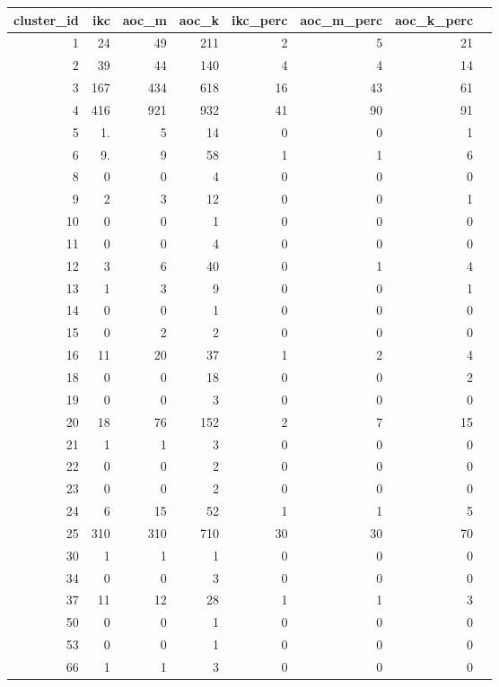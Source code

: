 \documentclass[12pt, oneside]{article}   	%
\begin{document}
\begin{table}[ht]
\centering
\begin{tabular}{rrrrrrrr}
  \hline
cluster\_id & ikc & aoc\_m & aoc\_k & ikc\_perc & aoc\_m\_perc & aoc\_k\_perc \\ 
  \hline
1 & 24 &  49 & 211 &   2 &   5 &  21 \\ 
2 & 39 &  44 & 140 &   4 &   4 &  14 \\ 
3 & 167 & 434 & 618 &  16 &  43 &  61 \\ 
4 & 416 & 921 & 932 &  41 &  90 &  91 \\ 
5 & 1. &   5 &  14 &   0 &   0 &   1 \\ 
6 & 9. &   9 &  58 &   1 &   1 &   6 \\ 
8 & 0 &   0 &   4 &   0 &   0 &   0 \\ 
9 & 2 &   3 &  12 &   0 &   0 &   1 \\ 
10 & 0 &   0 &   1 &   0 &   0 &   0 \\ 
11 & 0 &   0 &   4 &   0 &   0 &   0 \\ 
12 & 3 &   6 &  40 &   0 &   1 &   4 \\ 
13 & 1 &   3 &   9 &   0 &   0 &   1 \\ 
14 & 0 &   0 &   1 &   0 &   0 &   0 \\ 
15 & 0 &   2 &   2 &   0 &   0 &   0 \\ 
16 & 11 &  20 &  37 &   1 &   2 &   4 \\ 
18 & 0 &   0 &  18 &   0 &   0 &   2 \\ 
19 & 0 &   0 &   3 &   0 &   0 &   0 \\ 
20 & 18 &  76 & 152 &   2 &   7 &  15 \\ 
21 & 1 &   1 &   3 &   0 &   0 &   0 \\ 
22 & 0 &   0 &   2 &   0 &   0 &   0 \\ 
23 & 0 &   0 &   2 &   0 &   0 &   0 \\ 
24 & 6 &  15 &  52 &   1 &   1 &   5 \\ 
25 & 310 & 310 & 710 &  30 &  30 &  70 \\ 
30 & 1 &   1 &   1 &   0 &   0 &   0 \\ 
34 & 0 &   0 &   3 &   0 &   0 &   0 \\ 
37 & 11 &  12 &  28 &   1 &   1 &   3 \\ 
50 & 0 &   0 &   1 &   0 &   0 &   0 \\ 
53 & 0 &   0 &   1 &   0 &   0 &   0 \\ 
66 & 1 &   1 &   3 &   0 &   0 &   0 \\ 

\end{tabular}
\end{table}
\end{document}
